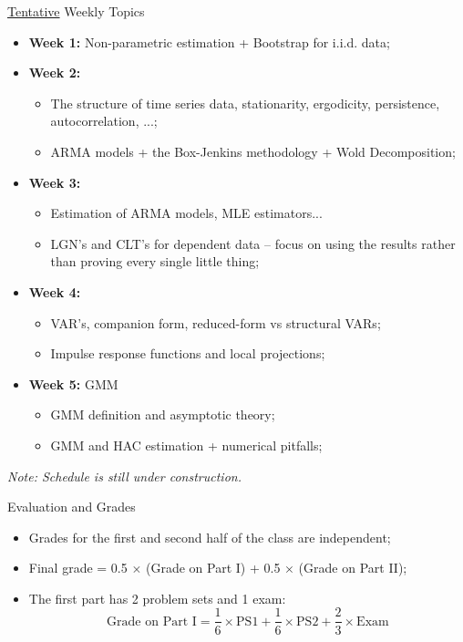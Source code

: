 \documentclass[aspectratio=169, xcolor=dvipsnames, 12pt]{beamer}
\begin{document}
\begin{frame}{\underline{Tentative} Weekly Topics}
  \begin{itemize}
    \item \textbf{Week 1:} Non-parametric estimation + Bootstrap for i.i.d. data;
    \item \textbf{Week 2:}
    \begin{itemize}
      \item The structure of time series data, stationarity, ergodicity, persistence, autocorrelation, ...;
      \item ARMA models + the Box-Jenkins methodology + Wold Decomposition;
    \end{itemize}
    \item \textbf{Week 3:} 
    \begin{itemize}
      \item Estimation of ARMA models, MLE estimators...
      \item LGN's and CLT's for dependent data -- focus on using the results rather than proving every single little thing;
    \end{itemize}
    \item \textbf{Week 4:} 
    \begin{itemize}
      \item VAR's, companion form, reduced-form vs structural VARs;
      \item Impulse response functions and local projections;
    \end{itemize}
    \item \textbf{Week 5:} GMM
    \begin{itemize}
      \item GMM definition and asymptotic theory;
      \item GMM and HAC estimation + numerical pitfalls;
  \end{itemize}
  \end{itemize}
  \vspace{1em}
  \textit{Note: Schedule is still under construction.}
\end{frame}

\begin{frame}{Evaluation and Grades}
  \begin{itemize}
    \item Grades for the first and second half of the class are independent;
    \item Final grade = 0.5 $\times$ (Grade on Part I) + 0.5 $\times$ (Grade on Part II);
    \item The first part has 2 problem sets and 1 exam:
    \begin{equation}
      \text{Grade on Part I} = \frac{1}{6} \times \text{PS1} + \frac{1}{6} \times \text{PS2} + \frac{2}{3} \times \text{Exam}
    \end{equation}
  \end{itemize}
\end{frame}
\end{document}
